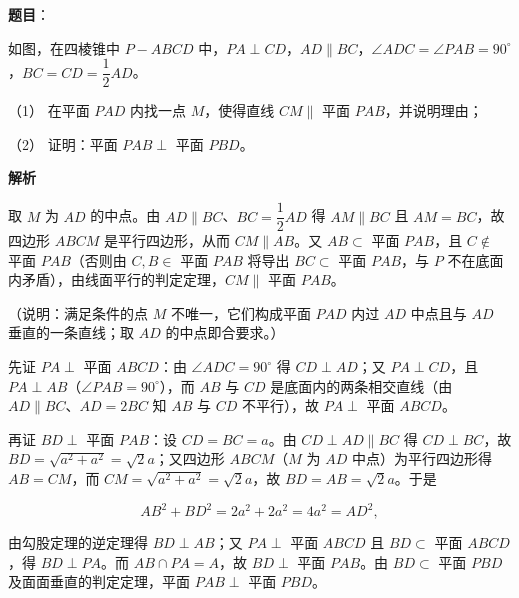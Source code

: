 \begin{answer}

\textbf{题目}：

如图，在四棱锥中 \(P-ABCD\) 中，\(PA\perp CD\)，\(AD\parallel BC\)，\(\angle ADC=\angle PAB=90^{\circ}\)，\(BC=CD=\dfrac{1}{2}AD\)。
\nopagebreak[4]
\begin{center}\end{center}
\nopagebreak[4]
（1） 在平面 \(PAD\) 内找一点 \(M\)，使得直线 \(CM\parallel\) 平面 \(PAB\)，并说明理由；

（2） 证明：平面 \(PAB\perp\) 平面 \(PBD\)。

\textbf{解析}


取 \(M\) 为 \(AD\) 的中点。由 \(AD\parallel BC\)、\(BC=\dfrac{1}{2}AD\) 得 \(AM\parallel BC\) 且 \(AM=BC\)，故四边形 \(ABCM\) 是平行四边形，从而 \(CM\parallel AB\)。又 \(AB\subset\) 平面 \(PAB\)，且 \(C\notin\) 平面 \(PAB\)（否则由 \(C,B\in\) 平面 \(PAB\) 将导出 \(BC\subset\) 平面 \(PAB\)，与 \(P\) 不在底面内矛盾），由线面平行的判定定理，\(CM\parallel\) 平面 \(PAB\)。

（说明：满足条件的点 \(M\) 不唯一，它们构成平面 \(PAD\) 内过 \(AD\) 中点且与 \(AD\) 垂直的一条直线；取 \(AD\) 的中点即合要求。）


先证 \(PA\perp\) 平面 \(ABCD\)：由 \(\angle ADC=90^{\circ}\) 得 \(CD\perp AD\)；又 \(PA\perp CD\)，且 \(PA\perp AB\)（\(\angle PAB=90^{\circ}\)），而 \(AB\) 与 \(CD\) 是底面内的两条相交直线（由 \(AD\parallel BC\)、\(AD=2BC\) 知 \(AB\) 与 \(CD\) 不平行），故 \(PA\perp\) 平面 \(ABCD\)。

再证 \(BD\perp\) 平面 \(PAB\)：设 \(CD=BC=a\)。由 \(CD\perp AD\parallel BC\) 得 \(CD\perp BC\)，故 \(BD=\sqrt{a^{2}+a^{2}}=\sqrt{2}a\)；又四边形 \(ABCM\)（\(M\) 为 \(AD\) 中点）为平行四边形得 \(AB=CM\)，而 \(CM=\sqrt{a^{2}+a^{2}}=\sqrt{2}a\)，故 \(BD=AB=\sqrt{2}a\)。于是

\nopagebreak[4]
\[
AB^{2}+BD^{2}=2a^{2}+2a^{2}=4a^{2}=AD^{2},
\]

由勾股定理的逆定理得 \(BD\perp AB\)；又 \(PA\perp\) 平面 \(ABCD\) 且 \(BD\subset\) 平面 \(ABCD\)，得 \(BD\perp PA\)。而 \(AB\cap PA=A\)，故 \(BD\perp\) 平面 \(PAB\)。由 \(BD\subset\) 平面 \(PBD\) 及面面垂直的判定定理，平面 \(PAB\perp\) 平面 \(PBD\)。



\end{answer}

